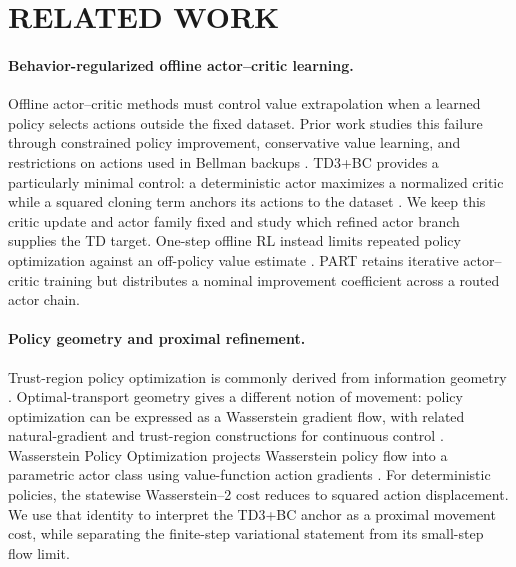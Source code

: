 \documentclass[twoside]{article}
\begin{document}
\section{RELATED WORK}
\label{sec:related}

\paragraph{Behavior-regularized offline actor--critic learning.}
Offline actor--critic methods must control value extrapolation when a learned
policy selects actions outside the fixed dataset. Prior work studies this
failure through constrained policy improvement, conservative value learning,
and restrictions on actions used in Bellman backups
\citep{fujimoto2019offpolicy,kumar2019bear}. TD3+BC provides a particularly
minimal control: a deterministic actor maximizes a normalized critic while a
squared cloning term anchors its actions to the dataset
\citep{fujimoto2021minimalist}. We keep this critic update and actor family
fixed and study which refined actor branch supplies the TD target.
One-step offline RL instead limits repeated policy optimization against an
off-policy value estimate \citep{brandfonbrener2021offline}. PART retains
iterative actor--critic training but distributes a nominal improvement
coefficient across a routed actor chain.

\paragraph{Policy geometry and proximal refinement.}
Trust-region policy optimization is commonly derived from information geometry
\citep{amari2000methods,schulman2015trust}. Optimal-transport geometry gives a
different notion of movement: policy optimization can be expressed as a
Wasserstein gradient flow, with related natural-gradient and trust-region
constructions for continuous control
\citep{zhang2018policy,moskovitz2020efficient,terpin2022trust,song2023metric}.
Wasserstein Policy Optimization projects Wasserstein policy flow into a
parametric actor class using value-function action gradients
\citep{pfau2025wpo}.
For deterministic policies, the statewise Wasserstein--2 cost reduces to
squared action displacement. We use that identity to interpret the TD3+BC
anchor as a proximal movement cost, while separating the finite-step
variational statement from its small-step flow limit.
\end{document}
